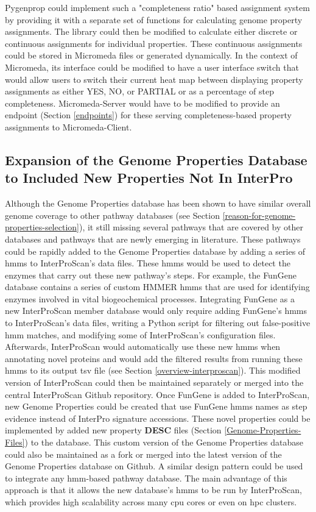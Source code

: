 Pygenprop could implement such a "completeness ratio" based assignment system by providing it with a separate set of functions for calculating genome property assignments. The library could then be modified to calculate either discrete or continuous assignments for individual properties. These continuous assignments could be stored in Micromeda files or generated dynamically. In the context of Micromeda, its interface could be modified to have a user interface switch that would allow users to switch their current heat map between displaying property assignments as either YES, NO, or PARTIAL or as a percentage of step completeness. Micromeda-Server would have to be modified to provide an endpoint (Section \ref{endpoints}) for these serving completeness-based property assignments to Micromeda-Client.

\subsection{Expansion of the Genome Properties Database to Included New Properties Not In InterPro}

Although the Genome Properties database has been shown to have similar overall genome coverage to other pathway databases (see Section \ref{reason-for-genome-properties-selection}), it still missing several pathways that are covered by other databases and pathways that are newly emerging in literature. These pathways could be rapidly added to the Genome Properties database by adding a series of \gls{hmm}s \cite{eddy2011accelerated} to InterProScan's data files. These \gls{hmm}s would be used to detect the enzymes that carry out these new pathway's steps. For example, the FunGene \cite{fish2013fungene} database contains a series of custom HMMER \cite{eddy2011accelerated} \gls{hmm}s that are used for identifying enzymes involved in vital biogeochemical processes. Integrating FunGene as a new InterProScan member database would only require adding FunGene's \gls{hmm}s to InterProScan's data files, writing a Python script for filtering out false-positive \gls{hmm} matches, and modifying some of InterProScan's configuration files. Afterwards, InterProScan would automatically use these new \gls{hmm}s when annotating novel proteins and would add the filtered results from running these \gls{hmm}s to its output \gls{tsv} file (see Section \ref{overview-interproscan}). This modified version of InterProScan could then be maintained separately or merged into the central InterProScan Github repository. Once FunGene is added to InterProScan, new Genome Properties could be created that use FunGene \gls{hmm}s names as step evidence instead of InterPro signature accessions. These novel properties could be implemented by added new property \textbf{DESC} files (Section \ref{Genome-Properties-Files}) to the database. This custom version of the Genome Properties database could also be maintained as a fork or merged into the latest version of the Genome Properties database on Github. A similar design pattern could be used to integrate any \gls{hmm}-based pathway database. The main advantage of this approach is that it allows the new database's \gls{hmm}s to be run by InterProScan, which provides high scalability across many \gls{cpu} cores or even on \gls{hpc} clusters.

